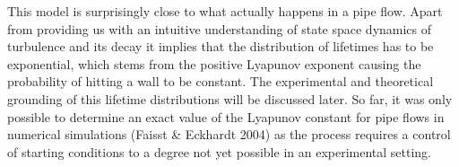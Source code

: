 \documentclass[11pt,a4paper]{article}
\begin{document}
This model is surprisingly close to what actually happens in a pipe flow.
Apart from providing us with an intuitive understanding of state space dynamics of turbulence and its decay it implies that the distribution of lifetimes has to be exponential, which stems from the positive Lyapunov exponent causing the probability of hitting a wall to be constant.
The experimental and theoretical grounding of this lifetime distributions will be discussed later.
So far, it was only possible to determine an exact value of the Lyapunov constant for pipe flows in numerical simulations (Faisst \& Eckhardt 2004) as the process requires a control of starting conditions to a degree not yet possible in an experimental setting.

\end{document}

